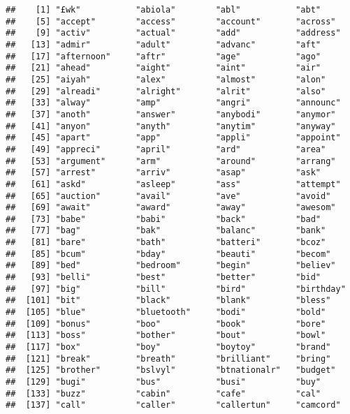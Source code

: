 \documentclass[]{article}
\begin{document}
\begin{verbatim}
##    [1] "£wk"           "abiola"        "abl"           "abt"          
##    [5] "accept"        "access"        "account"       "across"       
##    [9] "activ"         "actual"        "add"           "address"      
##   [13] "admir"         "adult"         "advanc"        "aft"          
##   [17] "afternoon"     "aftr"          "age"           "ago"          
##   [21] "ahead"         "aight"         "aint"          "air"          
##   [25] "aiyah"         "alex"          "almost"        "alon"         
##   [29] "alreadi"       "alright"       "alrit"         "also"         
##   [33] "alway"         "amp"           "angri"         "announc"      
##   [37] "anoth"         "answer"        "anybodi"       "anymor"       
##   [41] "anyon"         "anyth"         "anytim"        "anyway"       
##   [45] "apart"         "app"           "appli"         "appoint"      
##   [49] "appreci"       "april"         "ard"           "area"         
##   [53] "argument"      "arm"           "around"        "arrang"       
##   [57] "arrest"        "arriv"         "asap"          "ask"          
##   [61] "askd"          "asleep"        "ass"           "attempt"      
##   [65] "auction"       "avail"         "ave"           "avoid"        
##   [69] "await"         "award"         "away"          "awesom"       
##   [73] "babe"          "babi"          "back"          "bad"          
##   [77] "bag"           "bak"           "balanc"        "bank"         
##   [81] "bare"          "bath"          "batteri"       "bcoz"         
##   [85] "bcum"          "bday"          "beauti"        "becom"        
##   [89] "bed"           "bedroom"       "begin"         "believ"       
##   [93] "belli"         "best"          "better"        "bid"          
##   [97] "big"           "bill"          "bird"          "birthday"     
##  [101] "bit"           "black"         "blank"         "bless"        
##  [105] "blue"          "bluetooth"     "bodi"          "bold"         
##  [109] "bonus"         "boo"           "book"          "bore"         
##  [113] "boss"          "bother"        "bout"          "bowl"         
##  [117] "box"           "boy"           "boytoy"        "brand"        
##  [121] "break"         "breath"        "brilliant"     "bring"        
##  [125] "brother"       "bslvyl"        "btnationalr"   "budget"       
##  [129] "bugi"          "bus"           "busi"          "buy"          
##  [133] "buzz"          "cabin"         "cafe"          "cal"          
##  [137] "call"          "caller"        "callertun"     "camcord"      

\end{verbatim}
\end{document}
